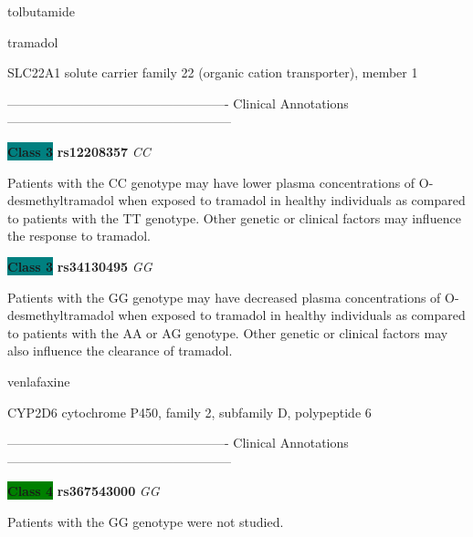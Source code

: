 \documentclass{resume} %
\begin{document}
\begin{rSection}{ tolbutamide }
\end{rSection}\begin{rSection}{ tramadol }
\item[]

\begin{rSubsection}{ SLC22A1 }{ solute carrier family 22 (organic cation transporter), member 1 }{}{}
\item[]

\item[] ---------------------------------------------------- Clinical Annotations -----------------------------------------------------\newline
\item \textbf{\colorbox{teal} {Class 3}} \textbf{ rs12208357 } \textit{ CC }
\item[] Patients with the CC genotype may have lower plasma concentrations of O-desmethyltramadol when exposed to tramadol in healthy individuals as compared to patients with the TT genotype. Other genetic or clinical factors may influence the response to tramadol.\item \textbf{\colorbox{teal} {Class 3}} \textbf{ rs34130495 } \textit{ GG }
\item[] Patients with the GG genotype may have decreased plasma concentrations of O-desmethyltramadol when exposed to tramadol in healthy individuals as compared to patients with the AA or AG genotype. Other genetic or clinical factors may also influence the clearance of tramadol.
\end{rSubsection}

\end{rSection}\begin{rSection}{ venlafaxine }
\item[]

\begin{rSubsection}{ CYP2D6 }{ cytochrome P450, family 2, subfamily D, polypeptide 6 }{}{}
\item[]

\item[] ---------------------------------------------------- Clinical Annotations -----------------------------------------------------\newline
\item \textbf{\colorbox{green} {Class 4}} \textbf{ rs367543000 } \textit{ GG }
\item[] Patients with the GG genotype were not studied.
\end{rSubsection}


\end{rSection}
\end{document}
